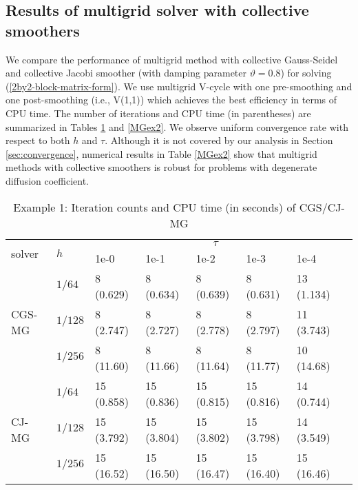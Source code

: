 \documentclass[smallcondensed]{svjour3}
\numberwithin{equation}{section} \numberwithin{table}{section}
\numberwithin{figure}{section}
\numberwithin{algorithm}{section}
\begin{document}
\subsection{Results of multigrid solver with collective smoothers}
\label{sec:MGsolver_results}
We compare the performance of multigrid method with collective Gauss-Seidel and collective Jacobi smoother (with damping parameter $\vartheta = 0.8$) for solving (\ref{2by2-block-matrix-form}). We use multigrid V-cycle with one pre-smoothing and one post-smoothing (i.e., V(1,1)) which achieves the best efficiency in terms of CPU time. The number of iterations and CPU time (in parentheses) are summarized in Tables \ref{MGex1} and \ref{MGex2}. We observe uniform convergence rate with respect to both $h$ and $\tau$. Although it is not covered by our analysis in Section {\ref{sec:convergence}}, numerical results in Table \ref{MGex2} show that multigrid methods with collective smoothers is robust for problems with degenerate diffusion coefficient. 
\setlength\extrarowheight{5pt}
\begin{table}
\begin{center}
\caption{Example 1: Iteration counts and CPU time (in seconds) of CGS/CJ-MG}
\begin{tabularx}{\linewidth}{m{25mm} *7{X}}
\hline
\multirow{2}{*}{solver} & \multirow{2}{*}{$h$} &\multicolumn{5}{c}{$\tau$} \\
                          \cline{3-7}
                                        &   &1e-0&1e-1&1e-2&1e-3&1e-4\\ 
\hline
\multirow{3}{*}{CGS-MG} &{$1/64$} &  8 (0.629) &    8 (0.634)  &    8 (0.639)  &    8 (0.631) &    13 (1.134) \\
                                  &{$1/128$} &  8 (2.747)  &   8 (2.727)  &    8 (2.778)   &   8 (2.797)   &   11 (3.743) \\
                                  &{$1/256$} & 8 (11.60)  &   8 (11.66)   &   8 (11.64)    &   8 (11.77)   &   10 (14.68)\\
\hline
\multirow{3}{*}{CJ-MG} &{$1/64$} &15 (0.858) &15 (0.836) &15 (0.815)&15 (0.816)&14 (0.744)\\
			     &{$1/128$} &15 (3.792)&15 (3.804)&15 (3.802)&15 (3.798)&14 (3.549)\\
			     &{$1/256$} &15 (16.52)&15 (16.50)&15 (16.47)&15 (16.40)&15 (16.46)\\
\hline
\end{tabularx}
\end{center}
\label{MGex1}
\end{table}
\end{document}
